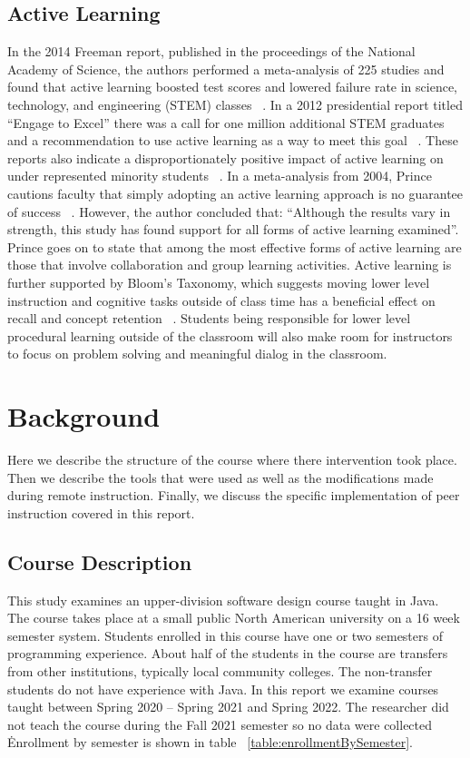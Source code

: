 \documentclass{article}
\begin{document}
\subsection{Active Learning}
In the 2014 Freeman report, published in the proceedings of the National Academy of Science, the authors performed a meta-analysis of 225 studies and found that active learning boosted test scores and lowered failure rate in science, technology, and engineering (STEM) classes ~\cite{freemanActiveLearningIncreases2014}. In a 2012 presidential report titled ``Engage to Excel'' there was a call for one million additional STEM graduates and a recommendation to use active learning as a way to meet this goal ~\cite{gatesEngageExcel2012}. These reports also indicate a disproportionately positive impact of active learning on under represented minority students ~\cite{freemanActiveLearningIncreases2014}.
In a meta-analysis from 2004, Prince cautions faculty that simply adopting an active learning approach is no guarantee of success ~\cite{princeDoesActiveLearning2004}. However, the author concluded that: ``Although the results vary in strength, this study has found support for all forms of active learning examined''. Prince goes on to state that among the most effective forms of active learning are those that involve collaboration and group learning activities.
Active learning is further supported by Bloom’s Taxonomy, which suggests moving lower level instruction and cognitive tasks outside of class time has a beneficial effect on recall and concept retention ~\cite{andersonTaxonomyLearningTeaching2014}. Students being responsible for lower level procedural learning outside of the classroom will also make room for instructors to focus on problem solving and meaningful dialog in the classroom.


\section{Background}

Here we describe the structure of the course where there intervention took place. Then we describe the tools that were used as well as the modifications made during remote instruction. Finally, we discuss the specific implementation of peer instruction covered in this report.

\subsection{Course Description}
This study examines an upper-division software design course taught in Java. The course takes place at a small public North American university on a 16 week semester system. Students enrolled in this course have one or two semesters of programming experience. About half of the students in the course are transfers from other institutions, typically local community colleges. The non-transfer students do not have experience with Java. 
In this report we examine courses taught between Spring 2020 – Spring 2021 and Spring 2022.  The researcher did not teach the course during the Fall 2021 semester so no data were collected \. Enrollment by semester is shown in table ~\ref{table:enrollmentBySemester}.
\end{document}
